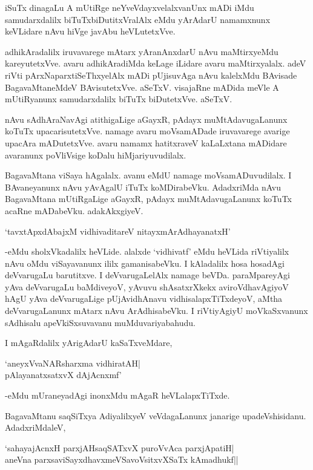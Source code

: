 iSuTx dinagaLu A mUtiRge neYveVdayxvelalxvanUnx mADi iMdu samudarxdalilx biTuTxbiDutitxVralAlx eMdu yArAdarU namamxnunx keVLidare nAvu hiVge javAbu heVLutetxVve.

adhikAradalilx iruvavarege mAtarx yAranAnxdarU nAvu maMtirxyeMdu kareyutetxVve. avaru adhikAradiMda keLage iLidare avaru maMtirxyalalx. adeV riVti pArxNaparxtiSeThxyelAlx mADi pUjisuvAga nAvu kalelxMdu BAvisade BagavaMtaneMdeV BAvisutetxVve. aSeTxV. visajaRne mADida meVle A mUtiRyanunx samudarxdalilx biTuTx biDutetxVve. aSeTxV.

nAvu sAdhAraNavAgi atithigaLige aGayxR, pAdayx muMtAdavugaLanunx koTuTx upacarisutetxVve. namage avaru moVsamADade iruvavarege avarige upacAra mADutetxVve. avaru namamx hatitxraveV kaLaLxtana mADidare avaranunx poVliVsige koDalu hiMjariyuvudilalx.

BagavaMtana viSaya hAgalalx. avanu eMdU namage moVsamADuvudilalx. I BAvaneyanunx nAvu yAvAgalU iTuTx koMDirabeVku. AdadxriMda nAvu BagavaMtana mUtiRgaLige aGayxR, pAdayx muMtAdavugaLanunx koTuTx acaRne mADabeVku. adakAkxgiyeV.

\begin{shloka}
`tavxtApxdAbajxM vidhivaditareV nitayxmArAdhayanatxH'
\end{shloka} 

-eMdu sholxVkadalilx heVLide. alalxde `vidhivatf' eMdu heVLida riVtiyalilx nAvu oMdu viSayavanunx ililx gamanisabeVku. I kAladalilx hosa hosadAgi deVvarugaLu barutitxve. I deVvarugaLelAlx namage beVDa. paraMpareyAgi yAva deVvarugaLu baMdiveyoV, yAvuvu shAsatxrXkekx aviroVdhavAgiyoV hAgU yAva deVvarugaLige pUjAvidhAnavu vidhisalapxTiTxdeyoV, aMtha deVvarugaLanunx mAtarx nAvu ArAdhisabeVku. I riVtiyAgiyU moVkaSxvanunx sAdhisalu apeVkiSxsuvavanu muMduvariyabahudu.

I mAgaRdalilx yArigAdarU kaSaTxveMdare,

\begin{shloka}
`aneyxVvaNARsharxma vidhiratAH|\\
pAlayanatxsatxvX dAjAcnxmf'
\end{shloka}

-eMdu mUraneyadAgi inonxMdu mAgaR heVLalapxTiTxde.

BagavaMtanu saqSiTxya AdiyalilxyeV veVdagaLanunx janarige upadeVshisidanu. AdadxriMdaleV,

\begin{shloka}
`sahayajAcnxH parxjAHsaqSATxvX puroVvAca parxjApatiH|\\
aneVna parxsaviSayxdhavxmeVSavoV\s sitxvXSaTx kAmadhukf||
\end{shloka}

